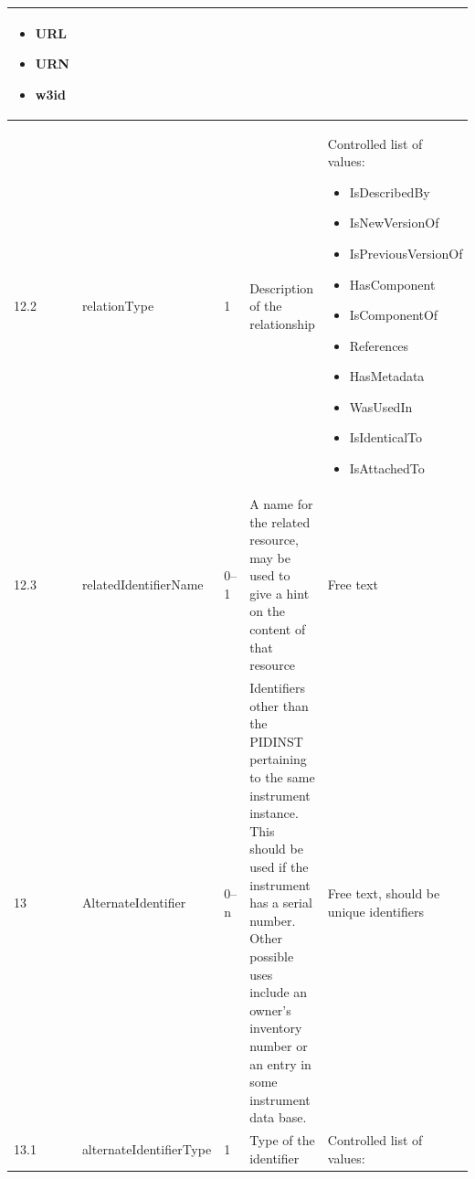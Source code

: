 \documentclass[titlepage=true,twoside=false,DIV=13]{scrartcl}
\begin{document}
\begin{longtable}{|l|p{\propcolw}|l|p{}|p{\valcolw}|}
\begin{minipage}[t]{\valcolw}
\begin{itemize}[nosep,leftmargin=3.5ex]
             \item URL
             \item URN
             \item w3id
             \end{itemize}
             \vspace{1ex}
           \end{minipage} \\
  \hline
  12.2   & relationType                         & 1
         & Description of the relationship
         & \begin{minipage}[t]{\valcolw}
             Controlled list of values:
             \begin{itemize}[nosep,leftmargin=3.5ex]
             \item IsDescribedBy
             \item IsNewVersionOf
             \item IsPreviousVersionOf
             \item HasComponent
             \item IsComponentOf
             \item References
             \item HasMetadata
             \item WasUsedIn
             \item IsIdenticalTo
             \item IsAttachedTo
             \end{itemize}
             \vspace{1ex}
           \end{minipage} \\
  \hline
  12.3   & relatedIdentifierName                & 0--1
         & A name for the related resource, may be used to give a hint
           on the content of that resource
         & Free text \\
  \hline
  13     & AlternateIdentifier                  & 0--n
         & Identifiers other than the PIDINST pertaining to the same
           instrument instance.  This should be used if the instrument
           has a serial number.  Other possible uses include an owner's
           inventory number or an entry in some instrument data base.
         & Free text, should be unique identifiers \\
  \hline
  13.1   & alternateIdentifierType              & 1
         & Type of the identifier
         & \begin{minipage}[t]{\valcolw}
             Controlled list of values:

\end{minipage}
\end{longtable}
\end{document}
